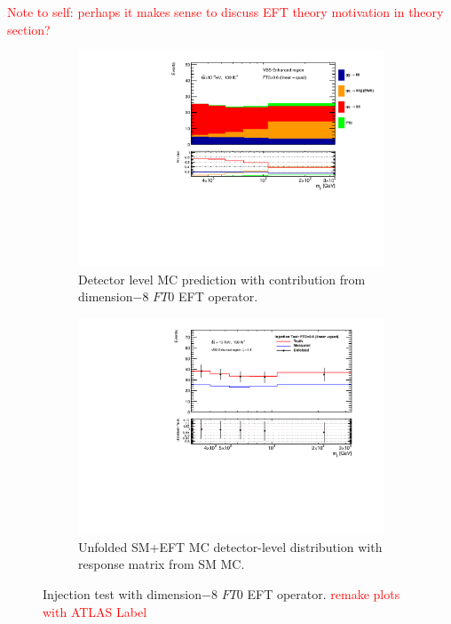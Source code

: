 \textcolor{red}{Note to self: perhaps it makes sense to discuss EFT theory motivation in theory section?}

\begin{figure}[htb]
    \centering
    \begin{subfigure}{.48\textwidth}
        \centering
        \includegraphics[width=.9\linewidth]{figures/Analysis/Unfolding/injection_test_FT0_quad_mjj_detectorPred.pdf}
        \caption{ Detector level MC prediction with contribution from dimension$-8$ $FT0$ EFT operator. \label{fig:Dim8cont} }
    \end{subfigure}
    \begin{subfigure}{.48\textwidth}
        \centering
        \includegraphics[width=.9\linewidth]{figures/Analysis/Unfolding/injection_test_FT0_quad_mjj.pdf}
        \caption{Unfolded SM+EFT MC detector-level distribution with response matrix from SM MC. \label{fig:InjectTestResult}}
    \end{subfigure}
    \caption{ Injection test with  dimension$-8$ $FT0$ EFT operator. \textcolor{red}{remake plots with ATLAS Label} \label{fig:injection_test_FT0_quad}}
\end{figure}


